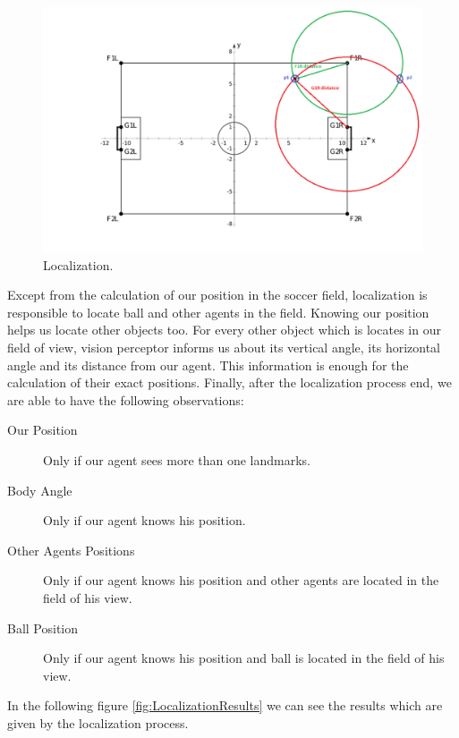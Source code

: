 \begin{figure}[!ht]
\centering
  \includegraphics[scale=0.3]{Chapter3/figures/Localization3.png}
  \caption{Localization.} 
  \label{fig:Localization}
\end{figure}
Except from the calculation of our position in the soccer field, localization is responsible to locate ball and other agents in the field. Knowing our position helps us locate other objects too. For every other object which is locates in our field of view, vision perceptor informs us about its vertical angle, its horizontal angle and its distance from our agent. This information is enough for the calculation of their exact positions. Finally, after the localization process end, we are able to have the following observations:\\
\begin{description}
	\item[Our Position] Only if our agent sees more than one landmarks.
	\item[Body Angle] Only if our agent knows his position.
	\item[Other Agents Positions]	Only if our agent knows his position and other agents are located in the field of his view.
	\item[Ball Position] Only if our agent knows his position and ball is located in the field of his view.
\end{description}
In the following figure \ref{fig:LocalizationResults} we can see the results which are given by the localization process.
